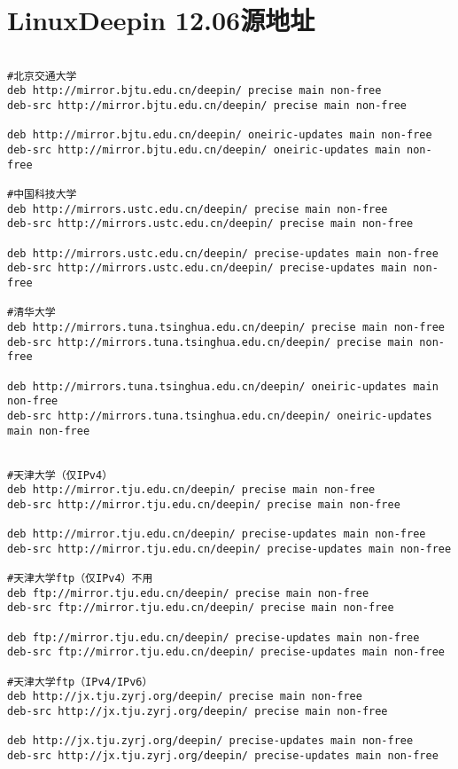 \section{LinuxDeepin 12.06源地址}

\begin{verbatim}

#北京交通大学
deb http://mirror.bjtu.edu.cn/deepin/ precise main non-free
deb-src http://mirror.bjtu.edu.cn/deepin/ precise main non-free

deb http://mirror.bjtu.edu.cn/deepin/ oneiric-updates main non-free
deb-src http://mirror.bjtu.edu.cn/deepin/ oneiric-updates main non-free

#中国科技大学
deb http://mirrors.ustc.edu.cn/deepin/ precise main non-free
deb-src http://mirrors.ustc.edu.cn/deepin/ precise main non-free

deb http://mirrors.ustc.edu.cn/deepin/ precise-updates main non-free
deb-src http://mirrors.ustc.edu.cn/deepin/ precise-updates main non-free

#清华大学
deb http://mirrors.tuna.tsinghua.edu.cn/deepin/ precise main non-free
deb-src http://mirrors.tuna.tsinghua.edu.cn/deepin/ precise main non-free

deb http://mirrors.tuna.tsinghua.edu.cn/deepin/ oneiric-updates main non-free
deb-src http://mirrors.tuna.tsinghua.edu.cn/deepin/ oneiric-updates main non-free


#天津大学（仅IPv4）
deb http://mirror.tju.edu.cn/deepin/ precise main non-free
deb-src http://mirror.tju.edu.cn/deepin/ precise main non-free

deb http://mirror.tju.edu.cn/deepin/ precise-updates main non-free
deb-src http://mirror.tju.edu.cn/deepin/ precise-updates main non-free

#天津大学ftp（仅IPv4）不用
deb ftp://mirror.tju.edu.cn/deepin/ precise main non-free
deb-src ftp://mirror.tju.edu.cn/deepin/ precise main non-free

deb ftp://mirror.tju.edu.cn/deepin/ precise-updates main non-free
deb-src ftp://mirror.tju.edu.cn/deepin/ precise-updates main non-free

#天津大学ftp（IPv4/IPv6）
deb http://jx.tju.zyrj.org/deepin/ precise main non-free
deb-src http://jx.tju.zyrj.org/deepin/ precise main non-free

deb http://jx.tju.zyrj.org/deepin/ precise-updates main non-free
deb-src http://jx.tju.zyrj.org/deepin/ precise-updates main non-free
\end{verbatim}


